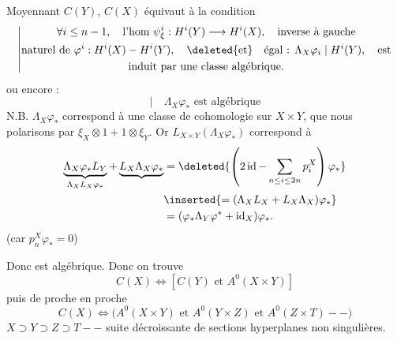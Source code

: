 Moyennant $C(Y)$, $C(X)$ équivaut à la condition
\[
\left|\begin{gathered}
\forall i\leq n-1,\quad\text{l'hom }\psi_\xi^i:H^i(Y)\longrightarrow H^i(X),\quad\text{inverse à gauche}\\
\text{naturel de }\varphi^i:H^i(X)\mathbin{-}H^i(Y),\quad\deleted{\text{et}}\quad\text{égal : }\Lambda_X\varphi_{i}\mid H^i(Y),\quad\text{est}\\
\text{induit par une classe algébrique.}
\end{gathered}\right.
\]
ou encore :
\[
\left|\quad\Lambda_X\varphi_*\text{ est algébrique}\right.
\]
\quad N.B. $\Lambda_X\varphi_*$ correspond à une classe de cohomologie
sur $X\times Y$, que nous polarisons par $\xi_X\otimes1+1\otimes\xi_Y$.
Or  $L_{X\times Y}(\Lambda_X\varphi_*)$ correspond à
\[
\begin{aligned}
\underbrace{\Lambda_X\varphi_*L_Y}_{\Lambda_XL_X\varphi_*}
 +\underbrace{L_X\Lambda_X\varphi_*}
 &=\deleted{\left(2\operatorname{id}-\sum_{n\leq i\leq2n}p_i^X\right)\varphi_*}\\
 &\inserted{=(\Lambda_XL_X+L_X\Lambda_X)\varphi_*}\\
 &=(\varphi_*\Lambda_Y\varphi^*+\operatorname{id}_X)\varphi_*.
\end{aligned}
\]
(car $p_n^X\varphi_*=0$)

Donc est algébrique. Donc on trouve
\[
C(X)\Longleftrightarrow[C(Y)\text{ et }A^0(X\times Y)]
\]
puis de proche en proche
\[
C(X)\Longleftrightarrow\bigl(A^0(X\times Y)\text{ et }A^0(Y\times Z)\text{ et }A^0(Z\times T)\mathbin{-}\mathbin{-}\bigr)
\]
\quad
$X\supset Y\supset Z\supset T\mathbin{-}\mathbin{-}$  suite décroissante de sections hyperplanes non singulières.

